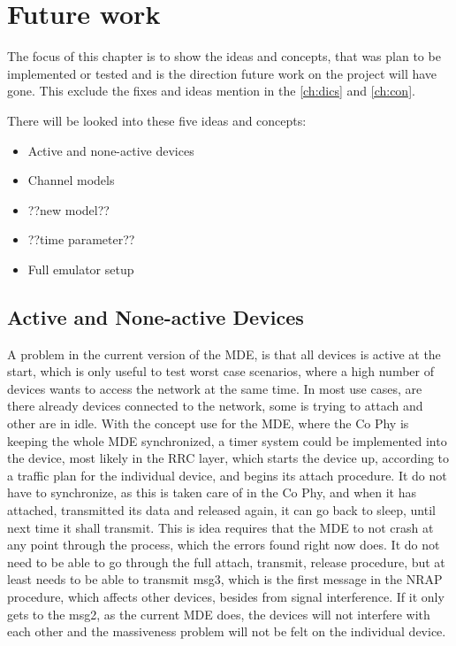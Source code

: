 \chapter{Future work}
\label{ch:Future}
The focus of this chapter is to show the ideas and concepts, that was plan to be implemented or tested and is the direction future work on the project will have gone. This exclude the fixes and ideas mention in the \autoref{ch:dics} and \autoref{ch:con}.

There will be looked into these five ideas and concepts:

\begin{itemize}
\item Active and none-active devices
\item Channel models
\item ??new model??
\item ??time parameter??
\item Full emulator setup
\end{itemize}


\section{Active and None-active Devices}
A problem in the current version of the MDE, is that all devices is active at the start, which is only useful to test worst case scenarios, where a high number of devices wants to access the network at the same time. In most use cases, are there already devices connected to the network, some is trying to attach and other are in idle. With the concept use for the MDE, where the Co Phy is keeping the whole MDE synchronized, a timer system could be implemented into the device, most likely in the RRC layer, which starts the device up, according to a traffic plan for the individual device, and begins its attach procedure. It do not have to synchronize, as this is taken care of in the Co Phy, and when it has attached, transmitted its data and released again, it can go back to sleep, until next time it shall transmit. This is idea requires that the MDE to not crash at any point through the process, which the errors found right now does. It do not need to be able to go through the full attach, transmit, release procedure, but at least needs to be able to transmit msg3, which is the first message in the NRAP procedure, which affects other devices, besides from signal interference. If it only gets to the msg2, as the current MDE does, the devices will not interfere with each other and the massiveness problem will not be felt on the individual device.

